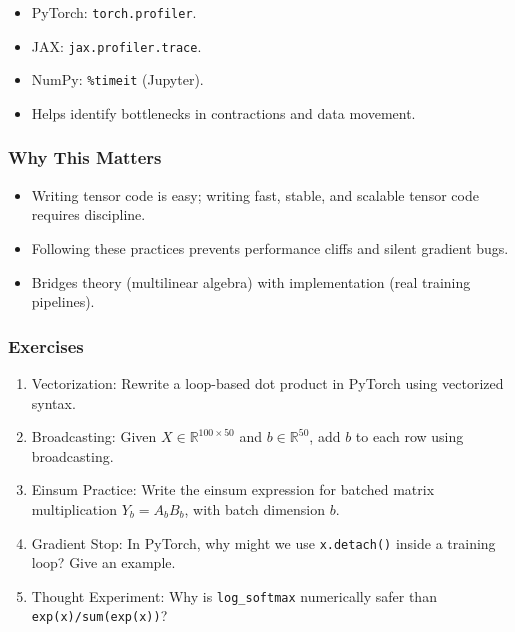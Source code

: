 \documentclass[
  letterpaper,
  DIV=11,
  numbers=noendperiod]{scrreprt}
\providecommand{\tightlist}{%
  \setlength{\itemsep}{0pt}\setlength{\parskip}{0pt}}
\begin{document}
\begin{itemize}
\tightlist
\item
  PyTorch: \texttt{torch.profiler}.
\item
  JAX: \texttt{jax.profiler.trace}.
\item
  NumPy: \texttt{\%timeit} (Jupyter).
\item
  Helps identify bottlenecks in contractions and data movement.
\end{itemize}

\subsubsection{Why This Matters}\label{why-this-matters-44}

\begin{itemize}
\tightlist
\item
  Writing tensor code is easy; writing fast, stable, and scalable tensor
  code requires discipline.
\item
  Following these practices prevents performance cliffs and silent
  gradient bugs.
\item
  Bridges theory (multilinear algebra) with implementation (real
  training pipelines).
\end{itemize}

\subsubsection{Exercises}\label{exercises-58}

\begin{enumerate}
\def\labelenumi{\arabic{enumi}.}
\item
  Vectorization: Rewrite a loop-based dot product in PyTorch using
  vectorized syntax.
\item
  Broadcasting: Given \(X \in \mathbb{R}^{100 \times 50}\) and
  \(b \in \mathbb{R}^{50}\), add \(b\) to each row using broadcasting.
\item
  Einsum Practice: Write the einsum expression for batched matrix
  multiplication \(Y_b = A_b B_b\), with batch dimension \(b\).
\item
  Gradient Stop: In PyTorch, why might we use \texttt{x.detach()} inside
  a training loop? Give an example.
\item
  Thought Experiment: Why is \texttt{log\_softmax} numerically safer
  than \texttt{exp(x)/sum(exp(x))}?
\end{enumerate}

\end{document}
